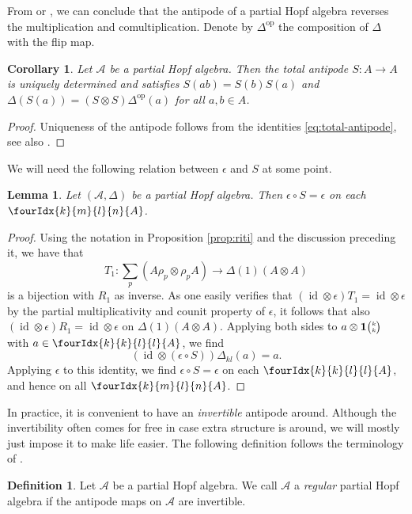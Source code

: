 \documentclass[10pt]{article}
\DeclareMathOperator{\id}{id}
\DeclareMathOperator{\op}{\mathrm{op}}
\newcommand{\Grt}[3]{#1{\tiny{\begin{pmatrix} #2\\#3\end{pmatrix}}}}
\newcommand{\UnitC}[2]{\Grt{\mathbf{1}}{#1}{#2}}
\newcommand{\Gr}[5]{\fourIdx{#2}{#4}{#3}{#5}{#1}}%
\newtheorem{Lem}[Theorem]{Lemma}
\newtheorem{Cor}[Theorem]{Corollary}
\theoremstyle{definition}
\newtheorem{Def}[Theorem]{Definition}
\numberwithin{equation}{section}
\begin{document}
From \cite[Proposition 3.5 and Proposition 3.7]{VDW1} or \cite[Theorem
6.12 and Corollary 6.16]{Boh1}, we can conclude that the antipode of a
partial Hopf algebra reverses the multiplication and
comultiplication. Denote by $\Delta^{\op}$ the composition of
$\Delta$ with the flip map.

\begin{Cor} \label{corollary:antipode} Let $\mathscr{A}$ be a partial
  Hopf algebra. Then the total antipode $S:A\rightarrow A$ is uniquely determined and satisfies
  $S(ab) = S(b)S(a)$ and $\Delta(S(a)) = (S\otimes S)\Delta^{\op}(a)$
  for all $a,b\in A$.
\end{Cor} 
\begin{proof} Uniqueness of the antipode follows from the identities \eqref{eq:total-antipode}, see also \cite[Remark 2.8.(ii)]{VDW1}. 
\end{proof} 

We will need the following relation between $\epsilon$ and $S$ at some point.

\begin{Lem}\label{LemCoAnt} Let $(\mathscr{A},\Delta)$ be a partial Hopf algebra. Then $\epsilon\circ S = \epsilon$ on each $\Gr{A}{k}{l}{m}{n}$.
\end{Lem}

\begin{proof} Using the notation in Proposition \ref{prop:riti} and the discussion preceding it, we have that \[T_1: \sum_p(A\rho_p\otimes \rho_p A)\rightarrow \Delta(1)(A\otimes A)\] is a bijection with $R_1$ as inverse. As one easily verifies that $(\id\otimes \epsilon)T_1 = \id\otimes \epsilon$ by the partial multiplicativity and counit property of $\epsilon$, it follows that also $(\id\otimes \epsilon)R_1 = \id\otimes \epsilon$ on $\Delta(1)(A\otimes A)$. Applying both sides to $a\otimes \UnitC{k}{k}$ with $a\in \Gr{A}{k}{l}{k}{l}$, we find \[(\id\otimes (\epsilon\circ S))\Delta_{kl}(a) = a.\] Applying $\epsilon$ to this identity, we find $\epsilon\circ S = \epsilon$ on each $\Gr{A}{k}{l}{k}{l}$, and hence on all $\Gr{A}{k}{l}{m}{n}$.
\end{proof} 


In practice, it is convenient to have an \emph{invertible} antipode around. Although the invertibility often comes for free in case extra structure is around, we will mostly just impose it to make life easier. The following definition follows the terminology of \cite{VDae1}. 

\begin{Def} Let $\mathscr{A}$ be a partial Hopf algebra. We call $\mathscr{A}$ a \emph{regular} partial Hopf algebra if the antipode maps on $\mathscr{A}$ are invertible.
\end{Def}
\end{document}

